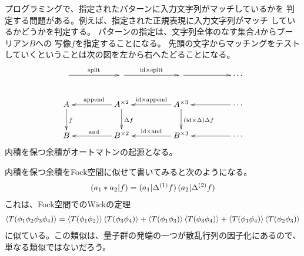 		\begin{observation}[文字列のパターンマッチング]\label{obs:文字列のパターンマッチング} %
			プログラミングで、指定されたパターンに入力文字列がマッチしているかを
			判定する問題がある。例えば、指定された正規表現に入力文字列がマッチ
			しているかどうかを判定する。
			パターンの指定は、文字列全体のなす集合$A$からブーリアン$B$への
			写像$f$を指定することになる。
			先頭の文字からマッチングをテストしていくということは次の図を左から右へたどることになる。
			\begin{equation}\xymatrix@C+2pc{
				\ar[r]^{\myop{split}} & \ar[r]^{\myid\times \myop{split}} & \ar[r] & \cdots \\
				A \ar[d]^{f} 
					& A^{\times 2} \ar[l]_{\myop{append}} \ar[d]^{\Delta f}
					& A^{\times 3} \ar[l]_{\myid\times \myop{append}} \ar[d]^{(\myid\times \Delta)\Delta f} & \cdots \ar[l] \\
				B & B^{\times 2} \ar[l]_{\myop{and}} 
					& B^{\times 3} \ar[l]_{\myid\times \myop{and}} & \cdots \ar[l] \\
			}\end{equation}
			内積を保つ余積がオートマトンの起源となる。
		\end{observation} %

		\begin{observation}[Wickの定理]\label{obs:Wickの定理} %
			内積を保つ余積をFock空間に似せて書いてみると次のようになる。
			\begin{equation*}\begin{split} %
				\obraket{a_1*a_2|f} &= \obraket{a_1|\Delta^{(1)}f}\obraket{a_2|\Delta^{(2)}f} \\
			\end{split}\end{equation*} %
			これは、Fock空間でのWickの定理
			\begin{equation*}\begin{split} %
				\braket{T(\phi_1\phi_2\phi_3\phi_4)}
				=\braket{T(\phi_1\phi_2)}\braket{T(\phi_3\phi_4)}
				+\braket{T(\phi_1\phi_3)}\braket{T(\phi_3\phi_4)}
				+\braket{T(\phi_1\phi_4)}\braket{T(\phi_2\phi_3)}
			\end{split}\end{equation*} %
			に似ている。この類似は、量子群の発端の一つが散乱行列の因子化にあるので、
			単なる類似ではないだろう。
		\end{observation} %

